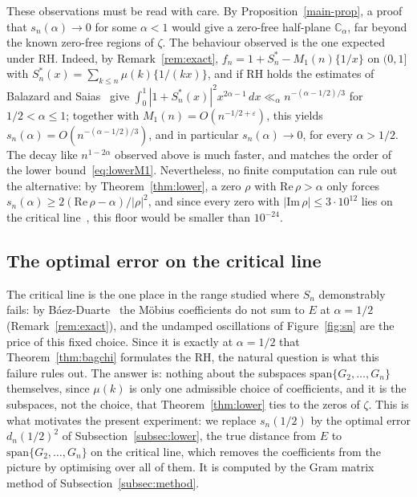 \documentclass[11pt]{extarticle}
\numberwithin{equation}{section}
\theoremstyle{plain}
\theoremstyle{remark}
\begin{document}
These observations must be read with care. By Proposition~\ref{main-prop}, a proof that
$s_n(\alpha) \to 0$ for some $\alpha < 1$ would give a zero-free half-plane
$\mathbb{C}_\alpha$, far beyond the known zero-free regions of $\zeta$. The behaviour
observed is the one expected under RH. Indeed, by Remark~\ref{rem:exact},
$f_n = 1 + S_n^{*} - M_1(n)\{1/x\}$ on $(0,1]$ with
$S_n^{*}(x) = \sum_{k \leq n} \mu(k)\{1/(kx)\}$, and if RH holds the estimates of
Balazard and Saias~\cite[Lemmes~4 et~5]{Balazard} give
$\int_0^1 |1 + S_n^{*}(x)|^2 x^{2\alpha-1}\,dx \ll_\alpha n^{-(\alpha-1/2)/3}$ for
$1/2 < \alpha \leq 1$; together with $M_1(n) = O(n^{-1/2+\varepsilon})$, this yields
$s_n(\alpha) = O(n^{-(\alpha-1/2)/3})$, and in particular $s_n(\alpha) \to 0$, for
every $\alpha > 1/2$. The decay like $n^{1-2\alpha}$ observed above is much faster,
and matches the order of the
lower bound~\eqref{eq:lowerM1}. Nevertheless, no finite computation can rule out the
alternative: by Theorem~\ref{thm:lower}, a
zero $\rho$ with $\mathrm{Re}\,\rho > \alpha$ only forces
$s_n(\alpha) \geq 2(\mathrm{Re}\,\rho - \alpha)/|\rho|^2$, and since every zero with
$|\mathrm{Im}\,\rho| \leq 3 \cdot 10^{12}$ lies on the critical line~\cite{platt}, this
floor would be smaller than $10^{-24}$.

\subsection{The optimal error on the critical line}\label{subsec:dn}

The critical line is the one place in the range studied where $S_n$ demonstrably
fails: by B\'aez-Duarte~\cite{baez-unitary} the Möbius coefficients do not sum to
$E$ at $\alpha = 1/2$ (Remark~\ref{rem:exact}), and the undamped oscillations of Figure~\ref{fig:sn}
are the price of this fixed choice. Since it is exactly at $\alpha = 1/2$ that
Theorem~\ref{thm:bagchi} formulates the RH, the natural question is what this
failure rules out. The answer is: nothing about the subspaces
$\mathrm{span}\{G_2, \dots, G_n\}$ themselves, since $\mu(k)$ is only one
admissible choice of coefficients, and it is the subspaces, not the choice, that
Theorem~\ref{thm:lower} ties to the zeros of $\zeta$. This is what motivates the
present experiment: we replace $s_n(1/2)$ by the optimal error $d_n(1/2)^2$ of
Subsection~\ref{subsec:lower}, the true distance from $E$ to
$\mathrm{span}\{G_2, \dots, G_n\}$ on the critical line, which removes the
coefficients from the picture by optimising over all of them. It is computed by
the Gram matrix method of Subsection~\ref{subsec:method}.
\end{document}
